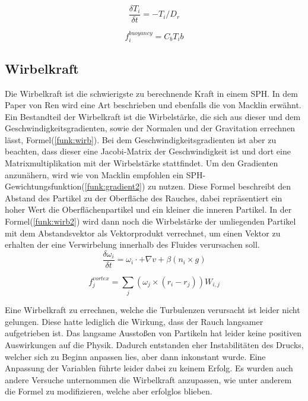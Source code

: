 \documentclass[intern,palatino]{cgBA}
\begin{document}
\begin{equation}\label{funk:temp2}
\frac{\delta T_i}{\delta t}  = - T_i/D_r
\end{equation}

\begin{equation}\label{funk:temp3}
f^{buoyancy}_i  = C_b T_i b
\end{equation}


\subsection{Wirbelkraft}\label{wirbel}

Die Wirbelkraft ist die schwierigste zu berechnende Kraft in einem SPH. In dem Paper von Ren \cite{ren2016fast} wird eine Art beschrieben und ebenfalls die von Macklin \cite{macklin2014unified} erwähnt.
\newline
Ein Bestandteil der Wirbelkraft ist die Wirbelstärke, die sich aus dieser und dem Geschwindigkeitsgradienten, sowie der Normalen und der Gravitation errechnen lässt, Formel(\ref{funk:wirb}). Bei dem Geschwindigkeitsgradienten ist aber zu beachten, dass dieser eine Jacobi-Matrix der Geschwindigkeit ist und dort eine Matrixmultiplikation mit der Wirbelstärke stattfindet. Um den Gradienten anzunähern, wird wie von Macklin \cite{macklin2014unified} empfohlen ein SPH-Gewichtungsfunktion(\ref{funk:gradient2}) zu nutzen. Diese Formel beschreibt den Abstand des Partikel zu der Oberfläche des Rauches, dabei repräsentiert ein hoher Wert die Oberflächenpartikel und ein kleiner die inneren Partikel.
In der Formel(\ref{funk:wirb2}) wird dann noch die Wirbelstärke der umliegenden Partikel mit dem Abstandsvektor als Vektorprodukt verrechnet, um einen Vektor zu erhalten der eine Verwirbelung innerhalb des Fluides verursachen soll.  
\begin{equation}\label{funk:wirb}
\frac{\delta \omega_i}{\delta t}  = \omega_i \cdot + \nabla v + \beta(n_i \times g)
\end{equation}

\begin{equation}\label{funk:wirb2}
f^{vortex}_j  = \sum_j (\omega_j \times (r_i -r_j)) W_{i,j}
\end{equation}

Eine Wirbelkraft zu errechnen, welche die Turbulenzen verursacht ist leider nicht gelungen. Diese hatte lediglich die Wirkung, dass der Rauch langsamer aufgetrieben ist. Das langsame Ausstoßen von Partikeln hat leider keine positiven Auswirkungen auf die Physik. Dadurch entstanden eher Instabilitäten des Drucks, welcher sich zu Beginn anpassen lies, aber dann inkonstant wurde. Eine Anpassung der Variablen führte leider dabei zu keinem Erfolg. Es wurden auch andere Versuche unternommen die Wirbelkraft anzupassen, wie unter anderem die Formel zu modifizieren, welche aber erfolglos blieben.
\end{document}
